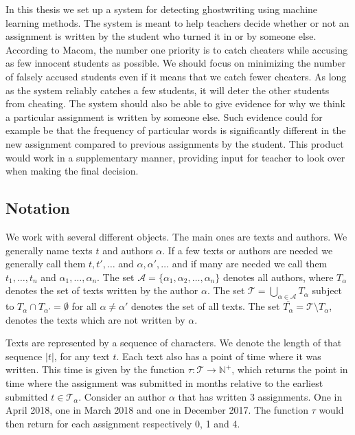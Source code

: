 In this thesis we set up a system for detecting ghostwriting using machine
learning methods. The system is meant to help teachers decide whether or not
an assignment is written by the student who turned it in or by someone else.
According to Macom, the number one priority is to catch cheaters while accusing
as few innocent students as possible. We should focus on minimizing the number
of falsely accused students even if it means that we catch fewer cheaters. As
long as the system reliably catches a few students, it will deter the other
students from cheating. The system should also be able to give evidence for why
we think a particular assignment is written by someone else. Such evidence could
for example be that the frequency of particular words is significantly different
in the new assignment compared to previous assignments by the student. This
product would work in a supplementary manner, providing input for teacher to
look over when making the final decision.

\subsection{Notation} \label{subsec:notation}

We work with several different objects. The main ones are texts and authors.
We generally name texts $t$ and authors $\alpha$. If a few texts or authors
are needed we generally call them $t, t', \dots$ and $\alpha, \alpha', \dots$
and if many are needed we call them $t_1, \dots, t_n$ and $\alpha_1, \dots,
\alpha_n$. The set $\mathcal{A} = \{\alpha_1, \alpha_2, \dots, \alpha_n\}$
denotes all authors, where $T_\alpha$ denotes the set of texts written by
the author $\alpha$. The set $\mathcal{T} = \bigcup_{\alpha \in \mathcal{A}}
T_\alpha$ subject to $T_{\alpha} \cap T_{\alpha'} = \emptyset$ for all $\alpha
\neq \alpha'$ denotes the set of all texts. The set $\overline{T_\alpha} =
\mathcal{T} \setminus T_\alpha$, denotes the texts which are not written by
$\alpha$.

Texts are represented by a sequence of characters. We denote the
length of that sequence $|t|$, for any text $t$. Each text also has a point
of time where it was written. This time is given by the function $\tau \colon
\mathcal{T} \rightarrow \mathbb{N}^+$, which returns the point in time where the
assignment was submitted in months relative to the earliest submitted $t \in
\mathcal{T_\alpha}$. Consider an author $\alpha$ that has written 3 assignments.
One in April 2018, one in March 2018 and one in December 2017. The function
$\tau$ would then return for each assignment respectively 0, 1 and 4.


